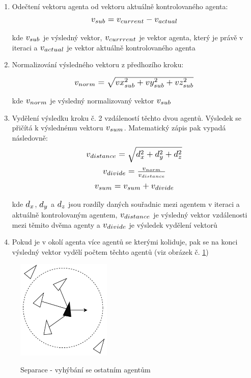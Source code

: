 \documentclass[czech,public,dept460,male,cpdeclaration]{diploma}
\begin{document}
\begin{enumerate}
	\item Odečtení vektoru agenta od vektoru aktuálně kontrolovaného agenta:
			\[ \scalebox{1.2}{$v_{sub} = v_{current} - v_{actual}$} \]
			
			kde \( \scalebox{1.2}{$v_{sub}$} \) je výsledný vektor, \( \scalebox{1.2}{$v_{currrent}$} \) je vektor agenta, který je právě v iteraci a \( \scalebox{1.2}{$v_{actual}$} \) je vektor aktuálně kontrolovaného agenta

	\item Normalizování výsledného vektoru z předhozího kroku:
	
			\[ \scalebox{1.2}{$v_{norm} = \sqrt{vx_{sub}^2 + vy_{sub}^2 + vz_{sub}^2}$} \]
			
			kde \( \scalebox{1.2}{$v_{norm}$} \) je výsledný normalizovaný vektor \( \scalebox{1.2}{$v_{sub}$} \)
	\item Vydělení výsledku kroku č. 2 vzdáleností těchto dvou agentů. Výsledek se přičítá k výslednému vektoru \( \scalebox{1.2}{$v_{sum}$} \). Matematický zápis pak vypadá následovně:
			\[ \scalebox{1.2}{$v_{distance} = \sqrt{d_x^2 + d_y^2 + d_z^2}$} \]
			\[ \scalebox{1.2}{$v_{divide} = \frac{v_{norm}}{v_{distance}}$} \]
			\[ \scalebox{1.2}{$v_{sum} = v_{sum} + v_{divide}$} \]
						
			kde \( \scalebox{1.2}{$d_{x}$} \), \( \scalebox{1.2}{$d_{y}$} \) a \( \scalebox{1.2}{$d_{z}$} \) jsou rozdíly daných souřadnic mezi agentem v iteraci a aktuálně kontrolovaným agentem, \( \scalebox{1.2}{$v_{distance}$} \) je výsledný vektor vzdálenosti mezi těmito dvěma agenty a \( \scalebox{1.2}{$v_{divide}$} \) je výsledek vydělení vektorů
			
	\item Pokud je v okolí agenta více agentů se kterými koliduje, pak se na konci výsledný vektor vydělí počtem těchto agentů (viz obrázek č. \ref{fig:separationImg})
\end{enumerate}

\begin{figure}[H]\centering\includegraphics[width=0.4\textwidth]{Figures/separation2.jpg}\label{fig:separationImg}
	\caption{Separace - vyhýbání se ostatním agentům}\label{fig:separationImg}
\end{figure}
\end{document}
